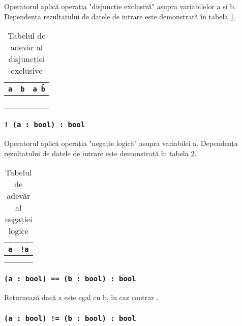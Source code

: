 Operatorul aplică operația "disjuncție exclusivă" asupra variabilelor a și b. Dependența rezultatului de datele de intrare este demonstrată în tabela \ref{logdifftable}.

\begin{table}[htb]
	\caption{Tabelul de adevăr al disjuncției exclusive}
	\label{logdifftable}
	\begin{tabular}{|c|c|c|}
		\hline
		\texttt{a} & \texttt{b} & \texttt{a \^ b} \\ \hline
		\false{} & \false{} & \false{}  	\\ \hline
		\false{} & \true{}  & \true{}   	\\ \hline
		\true{}  & \false{} & \true{}  		\\ \hline
		\true{}  & \true{}  & \false{}  	\\ \hline
	\end{tabular}
	\vspace{0em}
\end{table}

\subsubsection{\texttt{! (a : bool) : bool}}

Operatorul aplică operația "negație logică" asupra variabilei a. Dependența rezultatului de datele de intrare este demonstrată în tabela  \ref{invtable}.

\begin{table}[htb]
	\caption{Tabelul de adevăr al negației logice}
	\label{invtable}
	\begin{tabular}{|c|c|}
		\hline
		\texttt{a} & \texttt{!a} \\ \hline
		\false{} &  \true{}  \\ \hline
		\true{}  & \false{}  \\ \hline
	\end{tabular}
	\vspace{-2em}
\end{table}

\subsubsection{\texttt{(a : bool) == (b : bool) : bool}}

Returnează \true{} dacă a este egal cu b, în caz contrar \false{}.

\subsubsection{\texttt{(a : bool) != (b : bool) : bool}}

